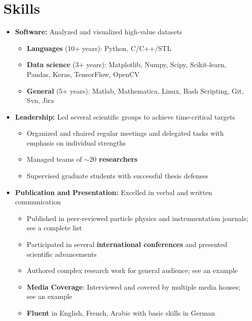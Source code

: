 \documentclass{myfancycv}
\begin{document}
\section{Skills}
\begin{itemize}

\item {\textbf{Software:} Analyzed and visualized high-value datasets
{\begin{itemize}\setlength\itemindent{-2.2em}
\item {\bf Languages} (10+ years): Python, C/C++/STL
\item {\bf Data science} (3+ years): Matplotlib, Numpy, Scipy, Scikit-learn, Pandas, Keras, TensorFlow, OpenCV
\item {\bf General} (5+ years): Matlab, Mathematica, Linux, Bash Scripting, Git, Svn, Jira
\end{itemize}
}
}

\vspace{6pt}

\item {\textbf{Leadership:} Led several scientific groups to achieve time-critical targets
{\begin{itemize}\setlength\itemindent{-2.2em}
    \item Organized and chaired regular meetings and delegated tasks with emphasis on individual strengths
    \item Managed teams of {\bf $\sim20$ researchers}
    \item Supervised graduate students with successful thesis defenses
\end{itemize}}%
}

\vspace{6pt}

\item{ \textbf{Publication and Presentation:} Excelled in verbal and written communication
{\begin{itemize}\setlength\itemindent{-2.2em}
\item Published in peer-reviewed particle physics and instrumentation journals; see a complete list \href{https://orcid.org/0000-0002-9169-0793}{}
\item Participated in several {\bf international conferences} and presented scientific advancements
\item Authored complex research work for general audience; see an example \href{http://atlas.cern/updates/physics-briefing/probing-dark-matter-higgs-boson}{}
  \item {\bf Media Coverage}: Interviewed and covered by multiple media houses; see an example \href{https://www.symmetrymagazine.org/article/the-invisible-higgs-bosons}{}

\item {\bf Fluent} in English, French, Arabic with basic skills in German

\end{itemize}}%
}


\end{itemize}
\end{document}
